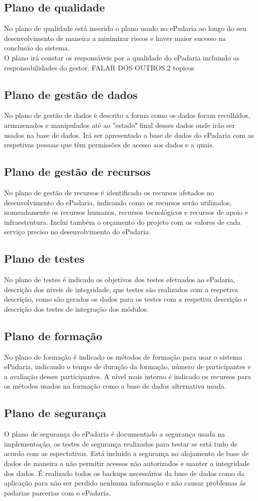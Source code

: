 \subsection{Plano de qualidade}
No plano de qualidade está inserido o plano usado no ePadaria ao longo do seu desenvolvimento de maneira a minimizar riscos e haver maior sucesso na conclusão do sistema. \\ O plano irá constar os responsáveis por a qualidade do ePadaria incluindo as responsabilidades do gestor.
FALAR DOS OUTROS 2 topicos
\subsection{Plano de gestão de dados}
No plano de gestão de dados é descrito a forma como os dados foram recolhidos, armazenados e manipulados até ao "estado" final desses dados onde irão ser usados na base de dados. Irá ser apresentado a base de dados do ePadaria com as respetivas pessoas que têm permissões de acesso aos dados e a quais.
\subsection{Plano de gestão de recursos}
No plano de gestão de recursos é identificado os recursos afetados no desenvolvimento do ePadaria, indicando como os recursos serão utilizados, nomeadamente os recursos humanos, recursos tecnológicos e recursos de apoio e infraestrutura. Inclui também o orçamento do projeto com os valores de cada serviço preciso no desenvolvimento do ePadaria.

\subsection{Plano de testes}
No plano de testes é indicado os objetivos dos testes efetuados ao ePadaria, descrição dos níveis de integridade, que testes são realizados com a respetiva descrição, como são gerados os dados para os testes com a respetiva descrição e descrição dos testes de integração dos módulos.
\subsection{Plano de formação}
No plano de formação é indicado os métodos de formação para usar o sistema ePadaria, indicando o tempo de duração da formação, número de participantes e a avaliação desses participantes. A nível mais interno é indicado os recursos para os métodos usados na formação como a base de dados alternativa usada.
\subsection{Plano de segurança}
O plano de segurança do ePadaria é documentado a segurança usada na implementação, os testes de segurança realizados para testar se está tudo de acordo com as espectativas. Está incluído a segurança no alojamento de base de dados de maneira a não permitir acessos não autorizados e manter a integridade dos dados. É realizado todos os backups necessários da base de dados como da aplicação para não ser perdido nenhuma informação e não causar problemas ás padarias parcerias com o ePadaria.

